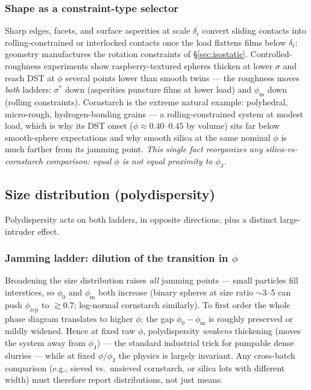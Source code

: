 \documentclass[11pt]{article}
\newcommand{\phiJ}{\phi_{\mathrm{J}}}
\newcommand{\phiO}{\phi_{0}}
\newcommand{\phiM}{\phi_{\mathrm{m}}}
\newcommand{\phiRCP}{\phi_{\mathrm{rcp}}}
\newcommand{\sigmastar}{\sigma^{*}}
\begin{document}
\subsubsection{Shape as a constraint-type selector}
Sharp edges, facets, and surface asperities at scale $\delta_{\mathrm{r}}$ convert sliding contacts into rolling-constrained or interlocked contacts once the load flattens films below $\delta_{\mathrm{r}}$: geometry manufactures the rotation constraints of \S\ref{sec:isostatic}. Controlled-roughness experiments \cite{hsiao2017,hsu2018} show raspberry-textured spheres thicken at lower $\sigma$ and reach DST at $\phi$ several points lower than smooth twins --- the roughness moves \emph{both} ladders: $\sigmastar$ down (asperities puncture films at lower load) and $\phiM$ down (rolling constraints). Cornstarch is the extreme natural example: polyhedral, micro-rough, hydrogen-bonding grains --- a rolling-constrained system at modest load, which is why its DST onset ($\phi \approx 0.40$--$0.45$ by volume) sits far below smooth-sphere expectations and why smooth silica at the same nominal $\phi$ is much farther from its jamming point. \emph{This single fact reorganizes any silica-vs-cornstarch comparison: equal $\phi$ is not equal proximity to $\phiJ$.}

\subsection{Size distribution (polydispersity)}
\label{sec:polydispersity}

Polydispersity acts on both ladders, in opposite directions, plus a distinct large-intruder effect.

\subsubsection{Jamming ladder: dilution of the transition in $\phi$}
Broadening the size distribution raises \emph{all} jamming points --- small particles fill interstices, so $\phiO$ and $\phiM$ both increase (binary spheres at size ratio $\sim$3--5 can push $\phiRCP$ to $\gtrsim 0.7$; log-normal cornstarch similarly). To first order the whole phase diagram translates to higher $\phi$; the gap $\phiO - \phiM$ is roughly preserved or mildly widened. Hence at fixed raw $\phi$, polydispersity \emph{weakens} thickening (moves the system away from $\phiJ$) --- the standard industrial trick for pumpable dense slurries --- while at fixed $\phi/\phiJ$ the physics is largely invariant. Any cross-batch comparison (e.g., sieved vs.\ unsieved cornstarch, or silica lots with different width) must therefore report distributions, not just means.
\end{document}
